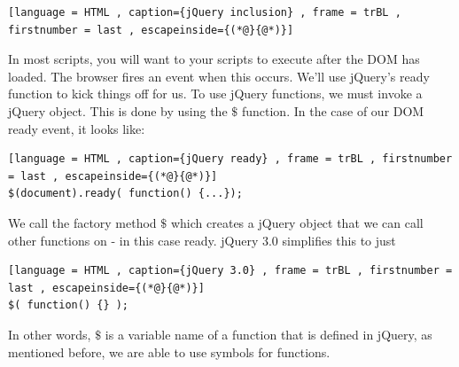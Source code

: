 \documentclass[a4paper]{article}
\theoremstyle{plain}
\theoremstyle{definition}
\theoremstyle{remark}
\begin{document}
\begin{flushleft}
\begin{lstlisting}[language = HTML , caption={jQuery inclusion} , frame = trBL , firstnumber = last , escapeinside={(*@}{@*)}]
\end{lstlisting}
In most scripts, you will want to your scripts to execute after the DOM has loaded. The browser fires an event when this occurs. We'll use jQuery's ready function to kick things off for us. To use jQuery functions, we must invoke a jQuery object. This is done by using the $\$$ function. In the case of our DOM ready event, it looks like:
\begin{lstlisting}[language = HTML , caption={jQuery ready} , frame = trBL , firstnumber = last , escapeinside={(*@}{@*)}]
$(document).ready( function() {...});
\end{lstlisting}
We call the factory method $\$$ which creates a jQuery object that we can call other functions on - in this case ready. jQuery 3.0 simplifies this to just
 \begin{lstlisting}[language = HTML , caption={jQuery 3.0} , frame = trBL , firstnumber = last , escapeinside={(*@}{@*)}]
$( function() {} );
\end{lstlisting}
In other words, $\$$ is a variable name of a function that is defined in jQuery, as mentioned before, we are able to use symbols for functions.

\end{flushleft}
\end{document}
